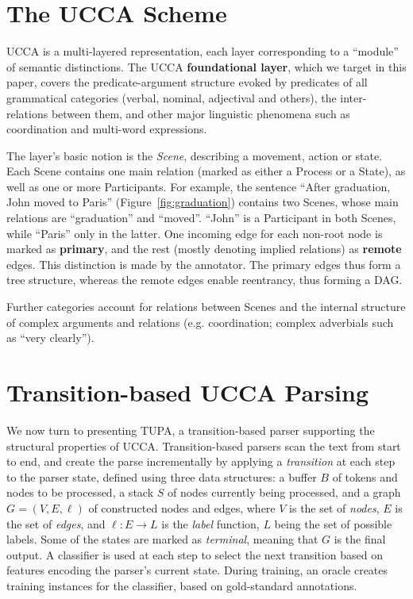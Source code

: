 \documentclass[11pt,a4paper]{article}
\newcommand{\parser}[1]{TUPA\textsubscript{#1}}
\newcommand{\figref}[1]{Figure~\ref{#1}}
\begin{document}
\section{The UCCA Scheme}\label{sec:ucca}

UCCA is a multi-layered representation, each layer corresponding
to a ``module'' of semantic distinctions.
The UCCA \textbf{foundational layer}, which we target in this paper, covers the predicate-argument
structure evoked by predicates of all grammatical categories
(verbal, nominal, adjectival and others), the inter-relations between them,
and other major linguistic phenomena such as coordination and multi-word expressions.

The layer's basic notion is the {\it Scene}, describing a movement, action or state.
Each Scene contains one main relation (marked as either a Process or a State),
as well as one or more Participants.
For example, the sentence ``After graduation, John moved to Paris'' (\figref{fig:graduation})
contains two Scenes, whose main relations are ``graduation'' and ``moved''.
``John'' is a Participant in both Scenes, while ``Paris'' only in the latter.
One incoming edge for each non-root node is marked as \textbf{primary},
and the rest (mostly denoting implied relations) as \textbf{remote} edges.
This distinction is made by the annotator.
The primary edges thus form a tree structure, whereas the remote edges enable reentrancy,
thus forming a DAG.

Further categories account for relations between Scenes and the internal structure of
complex arguments and relations (e.g. coordination; complex
adverbials such as ``very clearly'').


\section{Transition-based UCCA Parsing}\label{sec:direct_approach}

We now turn to presenting \parser{},
a transition-based parser supporting the structural properties of UCCA.
Transition-based parsers \cite{Nivre03anefficient} scan the text from start to end,
and create the parse incrementally by applying a \textit{transition}
at each step to the parser state,
defined using three data structures: a buffer $B$ of tokens and nodes to be processed,
a stack $S$ of nodes currently being processed,
and a graph $G=(V,E,\ell)$ of constructed nodes and edges,
where $V$ is the set of \emph{nodes}, $E$ is the set of \emph{edges},
and $\ell : E \to L$ is the \emph{label} function, $L$ being the set of possible labels.
Some of the states are marked as \textit{terminal}, meaning that $G$ is the final output.
A classifier is used at each step to select the next transition based on features
encoding the parser's current state.
During training, an oracle creates training instances for the classifier,
based on gold-standard annotations.
\end{document}
